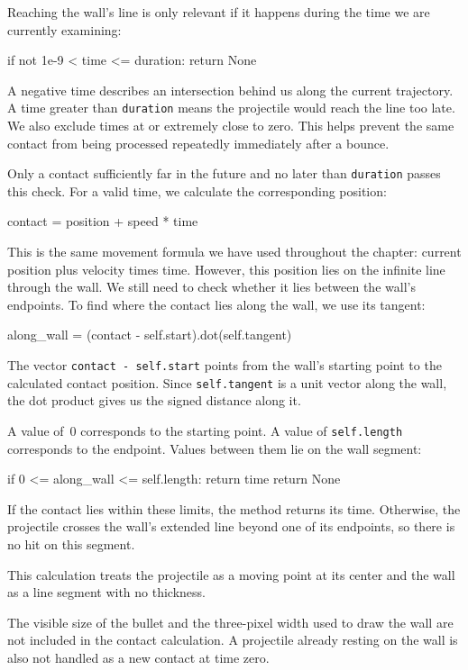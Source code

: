 Reaching the wall's line is only relevant if it happens during the time we are currently examining:
\begin{codebox}
if not 1e-9 < time <= duration:
    return None
\end{codebox}

A negative time describes an intersection behind us along the current trajectory. A time greater than \texttt{duration} means the projectile would reach the line too late. We also exclude times at or extremely close to zero. This helps prevent the same contact from being processed repeatedly immediately after a bounce.

Only a contact sufficiently far in the future and no later than \texttt{duration} passes this check. For a valid time, we calculate the corresponding position:
\begin{codebox}
	contact = position + speed * time
\end{codebox}

This is the same movement formula we have used throughout the chapter: current position plus velocity times time. However, this position lies on the infinite line through the wall. We still need to check whether it lies between the wall's endpoints. To find where the contact lies along the wall, we use its tangent:
\begin{codebox}
	along_wall = (contact - self.start).dot(self.tangent)
\end{codebox}

The vector \texttt{contact - self.start} points from the wall's starting point to the calculated contact position. Since \texttt{self.tangent} is a unit vector along the wall, the dot product gives us the signed distance along it.

A value of~0 corresponds to the starting point. A value of \texttt{self.length} corresponds to the endpoint. Values between them lie on the wall segment:
\begin{codebox}
if 0 <= along_wall <= self.length:
    return time
return None
\end{codebox}

If the contact lies within these limits, the method returns its time. Otherwise, the projectile crosses the wall's extended line beyond one of its endpoints, so there is no hit on this segment.

\begin{hintbox}
	This calculation treats the projectile as a moving point at its center and the wall as a line segment with no thickness.
	
	The visible size of the bullet and the three-pixel width used to draw the wall are not included in the contact calculation. A projectile already resting on the wall is also not handled as a new contact at time zero.
\end{hintbox}

